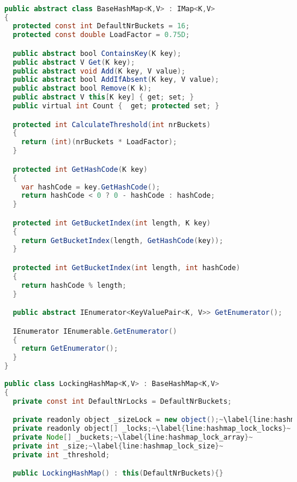 \begin{lstlisting}[label=lst:impl_hashmap_lock,
  caption={Lock Based Concurrent Hashmap Implementation},
  language=Java,  
  showspaces=false,
  showtabs=false,
  breaklines=true,
  showstringspaces=false,
  breakatwhitespace=true,
  commentstyle=\color{greencomments},
  keywordstyle=\color{bluekeywords},
  stringstyle=\color{redstrings},
  escapechar=~,
  morekeywords={atomic, retry, orelse, var, get, set, ref, out, readonly, virtual, override, region, endregion, foreach, lock}]  % Start your code-block

  public abstract class BaseHashMap<K,V> : IMap<K,V>
  {
    protected const int DefaultNrBuckets = 16;
    protected const double LoadFactor = 0.75D;

    public abstract bool ContainsKey(K key);
    public abstract V Get(K key);
    public abstract void Add(K key, V value);
    public abstract bool AddIfAbsent(K key, V value);
    public abstract bool Remove(K k);
    public abstract V this[K key] { get; set; }
    public virtual int Count {  get; protected set; }

    protected int CalculateThreshold(int nrBuckets)
    {
      return (int)(nrBuckets * LoadFactor);
    }

    protected int GetHashCode(K key)
    {
      var hashCode = key.GetHashCode();
      return hashCode < 0 ? 0 - hashCode : hashCode;
    }

    protected int GetBucketIndex(int length, K key)
    {
      return GetBucketIndex(length, GetHashCode(key));
    }

    protected int GetBucketIndex(int length, int hashCode)
    {
      return hashCode % length;
    }

    public abstract IEnumerator<KeyValuePair<K, V>> GetEnumerator();

    IEnumerator IEnumerable.GetEnumerator()
    {
      return GetEnumerator();
    }
  }
  
  public class LockingHashMap<K,V> : BaseHashMap<K,V>
  {
    private const int DefaultNrLocks = DefaultNrBuckets;

    private readonly object _sizeLock = new object();~\label{line:hashmap_lock_size_lock}~
    private readonly object[] _locks;~\label{line:hashmap_lock_locks}~
    private Node[] _buckets;~\label{line:hashmap_lock_array}~
    private int _size;~\label{line:hashmap_lock_size}~
    private int _threshold;

    public LockingHashMap() : this(DefaultNrBuckets){}


\end{lstlisting}
